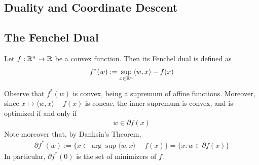\subsection{Duality and Coordinate Descent}
\subsection{The Fenchel Dual}
\begin{definition} Let $f: \mathbb{R}^n \to \mathbb{R}$ be a convex function. Then its Fenchel dual is defined as
\begin{eqnarray}
f^*(w) := \sup_{x \in \mathbb{R}^n} \langle w, x \rangle - f(x)
\end{eqnarray}
\end{definition}
Observe that $f^*(w)$ is convex, being a supremum of affine functions. Moreover, since $x \mapsto \langle w, x \rangle - f(x)$ is concae, the inner supremum is convex, and is optimized if and only if 
\begin{eqnarray}
w \in \partial f(x)
\end{eqnarray}
Note moreover that, by Danksin's Theorem, 
\begin{eqnarray}
\partial f^*(w) := \{x \in \arg\sup \langle w, x \rangle - f(x)\} = \{x: w \in \partial f(x)\}
\end{eqnarray}
In particular, $\partial f^*(0)$ is the set of minimizers of $f$. 
